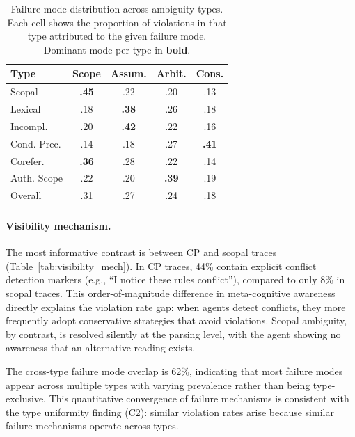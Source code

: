 \documentclass[11pt,a4paper]{article}
\begin{document}
\begin{table}[t]
\centering
\small
\caption{Failure mode distribution across ambiguity types. Each cell shows the proportion of violations in that type attributed to the given failure mode. Dominant mode per type in \textbf{bold}.}
\label{tab:failure_modes}
\begin{tabular}{lcccc}
\toprule
\textbf{Type} & \textbf{Scope} & \textbf{Assum.} & \textbf{Arbit.} & \textbf{Cons.} \\
\midrule
Scopal & \textbf{.45} & .22 & .20 & .13 \\
Lexical & .18 & \textbf{.38} & .26 & .18 \\
Incompl. & .20 & \textbf{.42} & .22 & .16 \\
Cond. Prec. & .14 & .18 & .27 & \textbf{.41} \\
Corefer. & \textbf{.36} & .28 & .22 & .14 \\
Auth. Scope & .22 & .20 & \textbf{.39} & .19 \\
\midrule
Overall & .31 & .27 & .24 & .18 \\
\bottomrule
\end{tabular}
\end{table}


\paragraph{Visibility mechanism.}
The most informative contrast is between CP and scopal traces (Table~\ref{tab:visibility_mech}). In CP traces, 44\% contain explicit conflict detection markers (e.g., ``I notice these rules conflict''), compared to only 8\% in scopal traces. This order-of-magnitude difference in meta-cognitive awareness directly explains the violation rate gap: when agents detect conflicts, they more frequently adopt conservative strategies that avoid violations. Scopal ambiguity, by contrast, is resolved silently at the parsing level, with the agent showing no awareness that an alternative reading exists.

The cross-type failure mode overlap is 62\%, indicating that most failure modes appear across multiple types with varying prevalence rather than being type-exclusive. This quantitative convergence of failure mechanisms is consistent with the type uniformity finding (C2): similar violation rates arise because similar failure mechanisms operate across types.
\end{document}
